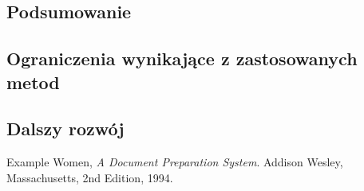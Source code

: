\documentclass[declaration,shortabstract]{iithesis}
\begin{document}
\subsection{Podsumowanie}
\subsection{Ograniczenia wynikające z zastosowanych metod}
\subsection{Dalszy rozwój}






\begin{thebibliography}{1}
  Example Women,
  \emph{A Document Preparation System}.
  Addison Wesley, Massachusetts,
  2nd Edition,
  1994.
\end{thebibliography}
\end{document}
